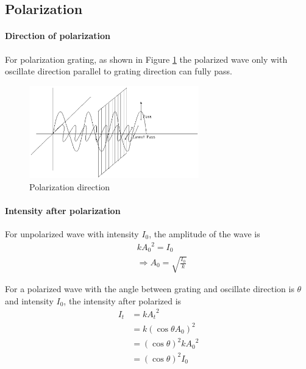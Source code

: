     \subsection{Polarization}
        \paragraph{Direction of polarization}
            For polarization grating, as shown in Figure \ref{pol_dir} the polarized wave only with oscillate direction parallel to grating direction can fully pass.

            \begin{figure}[H]
                \begin{center}
                    \includegraphics[height=4cm]{wave_charts/pol_dir.eps}
                \end{center}
                \caption{Polarization direction}
                \label{pol_dir}
            \end{figure}

        \paragraph{Intensity after polarization}
            For unpolarized wave with intensity $I_0$, the amplitude of the wave is
            \begin{align}
                & k{A_0}^2 = I_0 \\ 
                & \Rightarrow A_0 = \sqrt{\frac{I_0}{k}}
            \end{align}

            For a polarized wave with the angle between grating and oscillate direction is $\theta$ and intensity $I_0$, the intensity after polarized is 
            \begin{align}
                I_t &= k {A_t}^2 \\
                    &= k (\cos \theta A_0)^2 \\
                    &= (\cos \theta)^2 k {A_0}^2 \\
                    &= (\cos \theta)^2 I_0
            \end{align}

